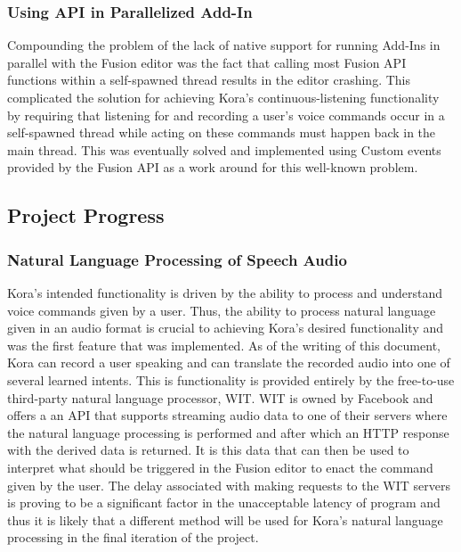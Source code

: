 \documentclass[onecolumn, draftclsnofoot,10pt, compsoc]{IEEEtran}
\begin{document}
    	\subsubsection{Using API in Parallelized Add-In}
		    Compounding the problem of the lack of native support for running Add-Ins in parallel with the Fusion editor was the fact that calling most Fusion API functions within a self-spawned thread results in the editor crashing.
		    This complicated the solution for achieving Kora's continuous-listening functionality by requiring that listening for and recording a user's voice commands occur in a self-spawned thread while acting on these commands must happen back in the main thread.
		    This was eventually solved and implemented using Custom events provided by the Fusion API as a work around for this well-known problem.


	\subsection{Project Progress}
    	\subsubsection{Natural Language Processing of Speech Audio}
		    Kora's intended functionality is driven by the ability to process and understand voice commands given by a user.
		    Thus, the ability to process natural language given in an audio format is crucial to achieving Kora's desired functionality and was the first feature that was implemented.
		    As of the writing of this document, Kora can record a user speaking and can translate the recorded audio into one of several learned intents.
		    This is functionality is provided entirely by the free-to-use third-party natural language processor, WIT.
		    WIT is owned by Facebook and offers a an API that supports streaming audio data to one of their servers where the natural language processing is performed and after which an HTTP response with the derived data is returned.
		    It is this data that can then be used to interpret what should be triggered in the Fusion editor to enact the command given by the user.
		    The delay associated with making requests to the WIT servers is proving to be a significant factor in the unacceptable latency of program and thus it is likely that a different method will be used for Kora's natural language processing in the final iteration of the project.
 
\end{document}
